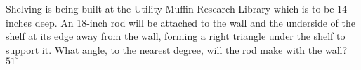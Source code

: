  {Shelving is being built at the Utility Muffin Research Library which is to be 14 inches deep. An 18-inch rod will be attached to the wall and the underside of the shelf at its edge away from the wall, forming a right triangle under the shelf to support it. What angle, to the nearest degree, will the rod make with the wall?}
{ $51^{\circ}$}
